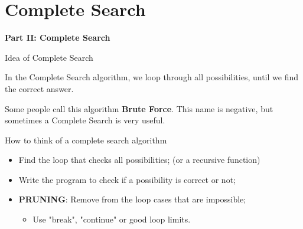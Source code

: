 \section{Complete Search}

\begin{frame}{}{}
  \begin{center}
    {\bf Part II: Complete Search}
  \end{center}
\end{frame}




\begin{frame}{Idea of Complete Search}

  In the Complete Search algorithm, we loop through all possibilities, until
  we find the correct answer.\bigskip

  Some people call this algorithm {\bf Brute Force}. This name is negative,
  but sometimes a Complete Search is very useful.\bigskip

  \begin{block}{How to think of a complete search algorithm}
    \begin{itemize}
      \item Find the loop that checks all possibilities; (or a recursive function)
      \item Write the program to check if a possibility is correct or not;
      \item {\bf PRUNING}: Remove from the loop cases that are impossible;
      \begin{itemize}
        \item Use "break", "continue" or good loop limits.
      \end{itemize}
    \end{itemize}
  \end{block}
\end{frame}


